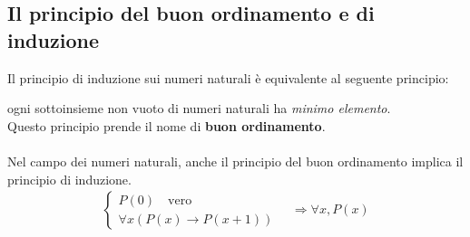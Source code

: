 \documentclass[italian]{article}
\begin{document}
\subsection{Il principio del buon ordinamento e di induzione}
Il principio di induzione sui numeri naturali è equivalente al seguente principio:
\par ogni sottoinsieme non vuoto di numeri naturali ha \textit{minimo elemento}.\\
Questo principio prende il nome di \textbf{buon ordinamento}.\\\\
Nel campo dei numeri naturali, anche il principio del buon ordinamento implica il principio di induzione.
\begin{gather*}
	\begin{cases*}
		P(0) \quad \text{vero} \\
		\forall x (P(x) \to P(x+1))
	\end{cases*}
	\quad \Rightarrow \forall x, P(x)
\end{gather*}
\end{document}
